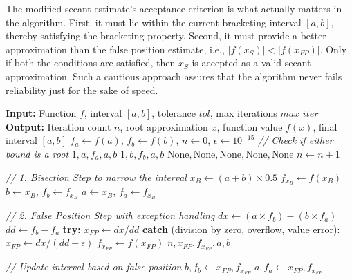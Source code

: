 \documentclass[amsmath, amssymb, aps]{revtex4-2}
\begin{document}
The modified secant estimate's acceptance criterion is what actually matters in the algorithm. First, it must lie within the current bracketing interval $[a,b]$, thereby satisfying the bracketing property. Second, it must provide a better approximation than the false position estimate, i.e., $|f(x_S)| < |f(x_{FP})|$. Only if both the conditions are satisfied, then $x_S$ is accepted as a valid secant approximation. Such a cautious approach assures that the algorithm never fails reliability just for the sake of speed.
    \begin{algorithmic}[1]
    \State \textbf{Input:} Function $f$, interval $[a, b]$, tolerance $tol$, max iterations $max\_iter$
    \State \textbf{Output:} Iteration count $n$, root approximation $x$, function value $f(x)$, final interval $[a, b]$
    \State $f_a \gets f(a)$, $f_b \gets f(b)$, $n \gets 0$, $\epsilon \gets 10^{-15}$
    \State \textit{// Check if either bound is a root}
        \State \Return $1, a, f_a, a, b$
    \EndIf
        \State \Return $1, b, f_b, a, b$
    \EndIf
        \State \Return $\text{None}, \text{None}, \text{None}, \text{None}, \text{None}$
    \EndIf
        \State $n \gets n + 1$
        
        \State \textit{// 1. Bisection Step to narrow the interval}
        \State $x_B \gets (a + b) \times 0.5$
        \State $f_{x_B} \gets f(x_B)$
            \State $b \gets x_B$, $f_b \gets f_{x_B}$
        \Else
            \State $a \gets x_B$, $f_a \gets f_{x_B}$
        \EndIf
    
        \State \textit{// 2. False Position Step with exception handling}
        \State $dx \gets (a \times f_b) - (b \times f_a)$
        \State $dd \gets f_b - f_a$
        \State \textbf{try:}
        \State \quad $x_{FP} \gets dx / dd$
        \State \textbf{catch} (division by zero, overflow, value error):
        \State \quad $x_{FP} \gets dx / (dd + \epsilon)$
        \State $f_{x_{FP}} \gets f(x_{FP})$
            \State \Return $n, x_{FP}, f_{x_{FP}}, a, b$
        \EndIf
    
        \State \textit{// Update interval based on false position}
            \State $b, f_b \gets x_{FP}, f_{x_{FP}}$
        \Else
            \State $a, f_a \gets x_{FP}, f_{x_{FP}}$
        \EndIf
        

\end{algorithmic}
\end{document}
